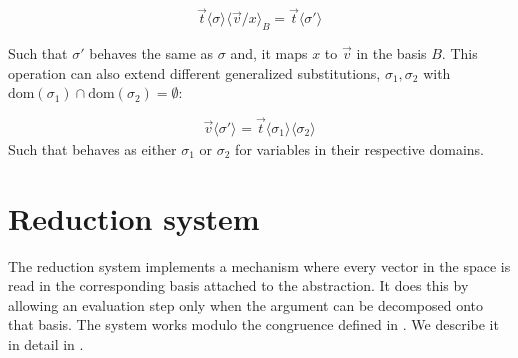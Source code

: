 \documentclass[runningheads,orivec]{llncs}
\newcommand\ansubst[2]{\ensuremath{\langle #1 \rangle_{#2}}}
\newcommand\dom[1]{\mathrm{dom}(#1)}
\newcommand\FV[1]{\mathrm{FV}(#1)}
\def\Lam#1#2#3{\lambda#1_{#2}\,{.}\,#3} %
\def\evalone{\rightarrow}
\def\sem#1{\llbracket#1\rrbracket}
\newcommand\basis[1]{\ensuremath{B_{ #1 }}}
\begin{document}
\[
  \vec{t}\ansubst{\sigma}{}\ansubst{\vec{v}/x}{B} = \vec{t}\ansubst{\sigma'}{}
\]

Such that $\sigma'$ behaves the same as $\sigma$ and, it maps $x$ to $\vec{v}$ in the basis $B$. This operation can also extend different generalized substitutions, $\sigma_1, \sigma_2$ with $\dom{\sigma_1}\cap\dom{\sigma_2}=\emptyset$:

\[
\vec{v}\ansubst{\sigma'}{} = \vec{t}\ansubst{\sigma_1}{}\ansubst{\sigma_2}{}
\]
Such that behaves as either $\sigma_1$ or $\sigma_2$ for variables in their respective domains.

\iffalse
A question that might arise from the previous remark could be if taking an $\eta$-expansion on a different basis would yield different a result. In this particular instance, it is fairly simple to see that it is not the case.

\begin{lemma}[$\eta$-expansion]
  For every $\lambda$-abstraction $(\Lam{x}{\basis{X}}{\vec t})$ where $y\not\in\FV{\vec{t}}$, value distribution $\vec{v}\in\sem{\sharp{\basis{X}}}$ a .nd 
  
  \[
    (\Lam{y}{\basis{Y}}{(\Lam{x}{\basis{X}}{\vec t})\ y})\ \vec{v}\evalone (\Lam{x}{\basis{X}}{\vec{t}})\ \vec v
  \]
\end{lemma}

\begin{proof}
  Let $\vec{v}\equiv\sum_{i=1}^{n} \alpha_i \vec{b_i}$ where $\vec{b_i}\in\sem{\basis{Y}}$, we have that:
  \begin{align*}
    (\Lam{y}{\basis{Y}}{(\Lam{x}{\basis{X}}{\vec{t}})}\ y)\ \vec{v}&\evalone(\Lam{x}{\basis{X}}{\vec{t}})\ansubst{\vec{v}/y}{\basis{Y}}\\ 
    &= \sum_{i=1}^{n} \alpha_i (\Lam{x}{\basis{X}}{\vec{t}}) \vec{b_i}\\ 
    &\equiv (\Lam{x}{\basis{X}}{\vec{t}})(\sum_{i=1}^{n}\alpha_i \vec{b_i})\\
    &\equiv (\Lam{x}{\basis{X}}{\vec{t}})\vec{v}
  \end{align*}
\end{proof}
\fi

\section{Reduction system}\label{sec:reduction}

The reduction system implements a mechanism where every vector in the space is read in the corresponding basis attached to the abstraction. It does this by allowing an evaluation step only when the argument can be decomposed onto that basis. The system works modulo the congruence defined in . We describe it in detail in .
\end{document}
